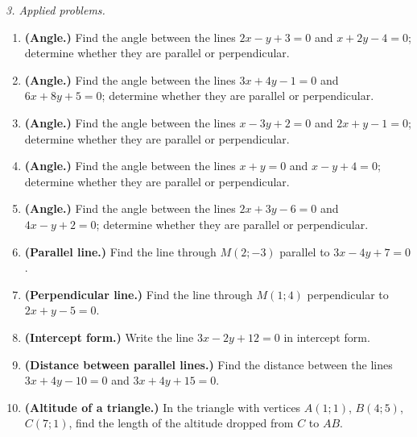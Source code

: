 \emph{3. Applied problems.}
\bigskip
\begin{enumerate}[label=\arabic*., leftmargin=*]
\item \textbf{(Angle.)} Find the angle between the lines $2x-y+3=0$ and $x+2y-4=0$; determine whether they are parallel or perpendicular.
\item \textbf{(Angle.)} Find the angle between the lines $3x+4y-1=0$ and $6x+8y+5=0$; determine whether they are parallel or perpendicular.
\item \textbf{(Angle.)} Find the angle between the lines $x-3y+2=0$ and $2x+y-1=0$; determine whether they are parallel or perpendicular.
\item \textbf{(Angle.)} Find the angle between the lines $x+y=0$ and $x-y+4=0$; determine whether they are parallel or perpendicular.
\item \textbf{(Angle.)} Find the angle between the lines $2x+3y-6=0$ and $4x-y+2=0$; determine whether they are parallel or perpendicular.
\item \textbf{(Parallel line.)} Find the line through $M(2;-3)$ parallel to $3x-4y+7=0$.
\item \textbf{(Perpendicular line.)} Find the line through $M(1;4)$ perpendicular to $2x+y-5=0$.
\item \textbf{(Intercept form.)} Write the line $3x-2y+12=0$ in intercept form.
\item \textbf{(Distance between parallel lines.)} Find the distance between the lines $3x+4y-10=0$ and $3x+4y+15=0$.
\item \textbf{(Altitude of a triangle.)} In the triangle with vertices $A(1;1)$, $B(4;5)$, $C(7;1)$, find the length of the altitude dropped from $C$ to $AB$.
\end{enumerate}

